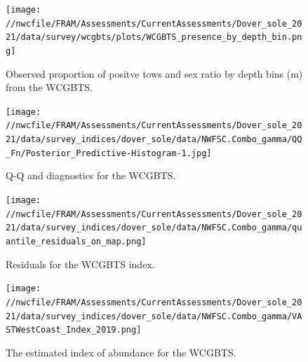 \documentclass[11pt,
  english,
  a4paper,
]{article}
\begin{document}
\tagmcend\tagstructend

\clearpage


\begin{figure}
\centering
\texttt{[image: //nwcfile/FRAM/Assessments/CurrentAssessments/Dover\_sole\_2021/data/survey/wcgbts/plots/WCGBTS\_presence\_by\_depth\_bin.png]}
\caption{Observed proportion of positve tows and sex ratio by depth bins (m) from the WCGBTS.\label{fig:pos-tows-sex-ratio}}
\end{figure}

\tagmcend\tagstructend

\newpage


\begin{figure}
\centering
\texttt{[image: //nwcfile/FRAM/Assessments/CurrentAssessments/Dover\_sole\_2021/data/survey\_indices/dover\_sole/data/NWFSC.Combo\_gamma/QQ\_Fn/Posterior\_Predictive-Histogram-1.jpg]}
\caption{Q-Q and diagnostics for the WCGBTS.\label{fig:wcgbt-qq}}
\end{figure}

\tagmcend\tagstructend

\newpage


\begin{figure}
\centering
\texttt{[image: //nwcfile/FRAM/Assessments/CurrentAssessments/Dover\_sole\_2021/data/survey\_indices/dover\_sole/data/NWFSC.Combo\_gamma/quantile\_residuals\_on\_map.png]}
\caption{Residuals for the WCGBTS index.\label{fig:wcgbt-resid}}
\end{figure}

\tagmcend\tagstructend

\newpage


\begin{figure}
\centering
\texttt{[image: //nwcfile/FRAM/Assessments/CurrentAssessments/Dover\_sole\_2021/data/survey\_indices/dover\_sole/data/NWFSC.Combo\_gamma/VASTWestCoast\_Index\_2019.png]}
\caption{The estimated index of abundance for the WCGBTS.\label{fig:wcgbt-index}}
\end{figure}
\end{document}
